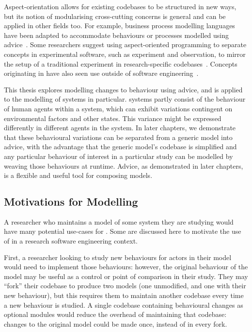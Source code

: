 Aspect-orientation allows for existing codebases to be structured in new ways,
but its notion of modularising cross-cutting concerns is general and can be
applied in other fields too. For example, business process modelling languages
have been adapted to accommodate behaviours or processes modelled using
advice~\cite{Cappelli_AOBPM,da2020implementation,charfi2007ao4bpel}. Some
researchers suggest using aspect-oriented programming to separate concepts in
experimental software, such as experiment and observation, to mirror the setup
of a traditional experiment in research-specific codebases~\cite{gulyas1999use}.
Concepts originating in \aop{} have also seen use outside of software
engineering~\cite{Cieslak_2011,Cappelli_AOBPM,da2020implementation,charfi2007ao4bpel}.

This thesis explores modelling changes to behaviour using advice, and is applied
to the modelling of \sociotechnical systems in particular. \Sociotechnical
systems partly consist of the behaviour of human agents within a system, which
can exhibit variations contingent on environmental factors and other states.
This variance might be expressed differently in different agents in the system.
In later chapters, we demonstrate that these behavioural variations can be
separated from a generic model into advice, with the advantage that the generic
model's codebase is simplified and any particular behaviour of interest in a
particular study can be modelled by weaving those behaviours at runtime. Advice,
as demonstrated in later chapters, is a flexible and useful tool for composing
models.

\subsection{Motivations for \AspectOriented{} Modelling}
\label{intro_motivations_for_using_aop_in_models}

A researcher who maintains a model of some system they are studying would have
many potential use-cases for \aop{}. Some are discussed here to motivate the use
of \aop{} in a research software engineering context.

First, a researcher looking to study new behaviours for actors in their model
would need to implement those behaviours: however, the original behaviour of the
model may be useful as a control or point of comparison in their study. They may
``fork'' their codebase to produce two models (one unmodified, and one with
their new behaviour), but this requires them to maintain another codebase every
time a new behaviour is studied. A single codebase containing behavioural
changes as optional modules would reduce the overhead of maintaining that
codebase: changes to the original model could be made once, instead of in every
fork.


